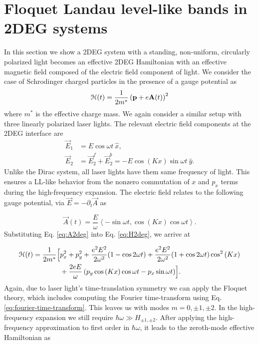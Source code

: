 \section{Floquet Landau level-like bands in 2DEG systems}
In this section we show a 2DEG system with a standing, non-uniform, circularly polarized light becomes an effective 2DEG Hamiltonian with an effective magnetic field composed of the electric field component of light.
We consider the case of Schrodinger charged particles in the presence of a gauge potential as
\begin{equation}\label{eq:H2deg}
  \mathcal{H}(t) = \dfrac{1}{2m^*} \left( \mathbf{p} + e \mathbf{A}(t)\right)^2
\end{equation}
where $m^*$ is the effective charge mass.
We again consider a similar setup with three linearly polarized laser lights.
The relevant electric field components at the 2DEG interface are
\begin{align} \label{eq:E2field}
  \vec{E}_{1} &= E \cos{\omega t}\ \hat{x}, \nonumber \\
  \vec{E}_{2} &= \vec{E}_2^f + \vec{E}_2^b = -E\cos{(K x)} \sin{\omega t}\ \hat{y}.
\end{align}%
Unlike the Dirac system, all laser lights have them same frequency of light.
This ensures a LL-like behavior from the nonzero commutation of $x$ and $p_x$ terms during the high-frequency expansion.
The electric field relates to the following gauge potential, via $\vec{E} = -\partial_t \vec{A}$ as

\begin{equation}\label{eq:A2deg}
  \vec{A}(t)= \dfrac{E}{\omega} \left\langle -\sin \omega t, \cos{(Kx)} \cos{\omega t} \right\rangle.
\end{equation}%
Substituting Eq. \eqref{eq:A2deg} into Eq. \eqref{eq:H2deg}, we arrive at

\begin{align}\label{eq:H2time}
  \mathcal{H}(t) = \dfrac{1}{2m^*} \Bigl[ &p_x^2 + p_y^2 + \dfrac{e^2 E^2}{2\omega^2}(1-\cos{2\omega t}) + \dfrac{e^2 E^2}{2\omega^2}(1+\cos{2\omega t}) \cos^2{(Kx)} \nonumber \\
  &+\dfrac{2eE}{\omega} \left(p_y \cos{(Kx)}\cos{\omega t} -  p_x \sin{\omega t}\right) \Bigr].
\end{align}
Again, due to laser light's time-translation symmetry we can apply the Floquet theory, which includes computing the Fourier time-transform using Eq. \eqref{eq:fourier-time-transform}.
This leaves us with modes $m=0,\pm1,\pm2$.
In the high-frequency expansion we still require $\hbar \omega \gg H_{\pm1,\pm2}$.
After applying the high-frequency approximation to first order in $\hbar \omega$, it leads to the zeroth-mode effective Hamiltonian as

